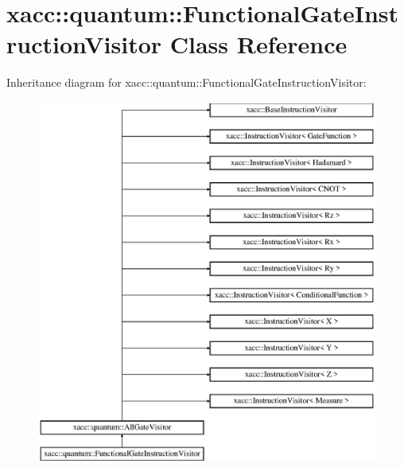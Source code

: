 \hypertarget{a00110}{}\section{xacc\+:\+:quantum\+:\+:Functional\+Gate\+Instruction\+Visitor Class Reference}
\label{a00110}
Inheritance diagram for xacc\+:\+:quantum\+:\+:Functional\+Gate\+Instruction\+Visitor\+:\begin{figure}[H]
\begin{center}
\leavevmode
\includegraphics[height=12.000000cm]{a00110}
\end{center}
\end{figure}
